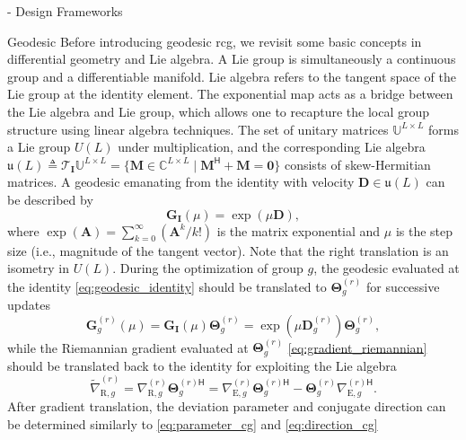 \documentclass[journal]{IEEEtran}
\begin{document}
\begin{section}{- Design Frameworks}
	\begin{subsection}{Geodesic }
		Before introducing geodesic \gls{rcg}, we revisit some basic concepts in differential geometry and Lie algebra.
		A Lie group is simultaneously a continuous group and a differentiable manifold.
		Lie algebra refers to the tangent space of the Lie group at the identity element.
		The exponential map acts as a bridge between the Lie algebra and Lie group, which allows one to recapture the local group structure using linear algebra techniques.
		The set of unitary matrices $\mathbb{U}^{L \times L}$ forms a Lie group $U(L)$ under multiplication, and the corresponding Lie algebra $\mathfrak{u}(L) \triangleq \mathcal{T}_{\mathbf{I}}\mathbb{U}^{L \times L} = \{\mathbf{M} \in \mathbb{C}^{L \times L} \mid \mathbf{M}^\mathsf{H} + \mathbf{M} = \mathbf{0}\}$ consists of skew-Hermitian matrices.
		A geodesic emanating from the identity with velocity $\mathbf{D} \in \mathfrak{u}(L)$ can be described by \cite{Edelman1998}
		\begin{equation}
			\mathbf{G}_\mathbf{I}(\mu) = \exp(\mu \mathbf{D}),
			\label{eq:geodesic_identity}
		\end{equation}
		where $\exp(\mathbf{A}) = \sum_{k=0}^\infty (\mathbf{A}^k/k!)$ is the matrix exponential and $\mu$ is the step size (i.e., magnitude of the tangent vector).
		Note that the right translation is an isometry in $U(L)$.
		During the optimization of group $g$, the geodesic evaluated at the identity \eqref{eq:geodesic_identity} should be translated to $\mathbf{\Theta}_g^{(r)}$ for successive updates \cite{Abrudan2008}
		\begin{equation}
			\mathbf{G}_g^{(r)}(\mu) = \mathbf{G}_\mathbf{I}(\mu) \mathbf{\Theta}_g^{(r)} = \exp(\mu \mathbf{D}_g^{(r)}) \mathbf{\Theta}_g^{(r)},
			\label{eq:geodesic_translated}
		\end{equation}
		while the Riemannian gradient evaluated at $\mathbf{\Theta}_g^{(r)}$ \eqref{eq:gradient_riemannian} should be translated back to the identity for exploiting the Lie algebra \cite{Abrudan2008}
		\begin{equation}
			\tilde{\nabla}_{\mathrm{R},g}^{(r)} = \nabla_{\mathrm{R},g}^{(r)} \mathbf{\Theta}_g^{(r)\mathsf{H}} = \nabla_{\mathrm{E},g}^{(r)} \mathbf{\Theta}_g^{(r)\mathsf{H}} - \mathbf{\Theta}_g^{(r)} {\nabla_{\mathrm{E},g}^{(r)\mathsf{H}}}.
			\label{eq:gradient_translated}
		\end{equation}
		After gradient translation, the deviation parameter and conjugate direction can be determined similarly to \eqref{eq:parameter_cg} and \eqref{eq:direction_cg}

\end{subsection}
\end{section}
\end{document}
